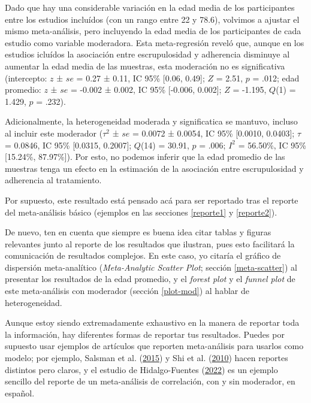 \documentclass[
  bookmarksnumbered]{article}
\begin{document}
\begin{tcolorbox}[enhanced,attach boxed title to top center={yshift=-3mm,yshifttext=-1mm},
  colback=iacol!5!white,colframe=iacol!75!white,colbacktitle=iacol,
  title=Ejemplo de reporte con moderador continuo,fonttitle=\bfseries, parbox=false,
  boxed title style={size=small,colframe=iacol} ]
  
Dado que hay una considerable variación en la edad media de los participantes entre los estudios incluídos (con un rango entre 22 y 78.6), volvimos a ajustar el mismo meta-análisis, pero incluyendo la edad media de los participantes de cada estudio como variable moderadora. Esta meta-regresión reveló que, aunque en los estudios icluídos la asociación entre escrupulosidad y adherencia disminuye al aumentar la edad media de las muestras, esta moderación no es significativa (intercepto: $z$ ± $se$ = 0.27 ± 0.11, IC 95\% [0.06, 0.49]; $Z$ = 2.51, $p$ = .012; edad promedio: $z$ ± $se$ = -0.002 ± 0.002, IC 95\% [-0.006, 0.002]; $Z$ = -1.195, $Q$(1) = 1.429,   $p$ = .232). 

Adicionalmente, la heterogeneidad moderada y significatica se mantuvo, incluso al incluir este moderador ($\tau^2$ ± $se$ =  0.0072 ± 0.0054, IC 95\% [0.0010, 0.0403]; $\tau$ = 0.0846, IC 95\% [0.0315, 0.2007]; $Q$(14) =  30.91, $p$ = .006; $I^2$ = 56.50\%, IC 95\% [15.24\%, 87.97\%]). Por esto, no podemos inferir que la edad promedio de las muestras tenga un efecto en la estimación de la asociación entre escrupulosidad y adherencia al tratamiento.  

\end{tcolorbox}

Por supuesto, este resultado está pensado acá para ser reportado tras el reporte del meta-análisis básico (ejemplos en las secciones \ref{reporte1} y \ref{reporte2}).

De nuevo, ten en cuenta que siempre es buena idea citar tablas y figuras relevantes junto al reporte de los resultados que ilustran, pues esto facilitará la comunicación de resultados complejos. En este caso, yo citaría el gráfico de dispersión meta-analítico (\emph{Meta-Analytic Scatter Plot}; sección \ref{meta-scatter}) al presentar los resultados de la edad promedio, y el \emph{forest plot} y el \emph{funnel plot} de este meta-análisis con moderador (sección \ref{plot-mod}) al hablar de heterogeneidad.

Aunque estoy siendo extremadamente exhaustivo en la manera de reportar toda la información, hay diferentes formas de reportar tus resultados. Puedes por supuesto usar ejemplos de artículos que reporten meta-análisis para usarlos como modelo; por ejemplo, Salsman et al. (\protect\hyperlink{ref-salsmanMetaanalyticApproachExamining2015}{2015}) y Shi et al. (\protect\hyperlink{ref-shiCorrelationAdherenceRates2010}{2010}) hacen reportes distintos pero claros, y el estudio de Hidalgo-Fuentes (\protect\hyperlink{ref-hidalgo-fuentesUsoProblematicoInternet2022}{2022}) es un ejemplo sencillo del reporte de un meta-análisis de correlación, con y sin moderador, en español.
\end{document}
